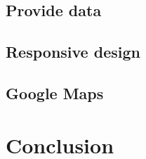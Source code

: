 \documentclass{article}
\begin{document}
\subsection{Provide data}

\subsection{Responsive design}

\subsection{Google Maps}

\section{Conclusion}
\end{document}
